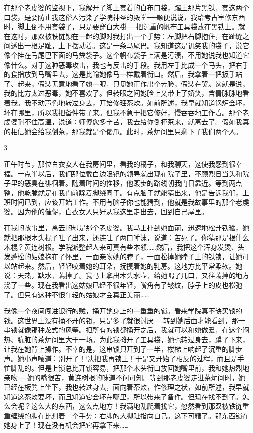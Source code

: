 在那个老虔婆的监视下，我解开了脚上套着的白布口袋，踏上那片黑铁，套这两个口袋，是要防止我这俗人污染了学院神圣的殿堂──顺便说说，我给考古室修东西时，脚上倒不用套袋子，只是要穿白大褂──把沉重的帆布工具袋放在黑铁上。就在这时，那双被铁链锁在一起的脚对我打出一个手势：左脚把右脚抱住，在趾缝之间透出一根足趾，上下摆动着。这是一条马尾巴。我知道这是讥笑我的袋子，说它像个挂在马尾巴下面的马粪袋子。这个帆布袋子上满是污渍，不用她说我也知道它像什么。对于这种恶毒攻击，我也有反击的手段。我用左手比成一个马头，把右手的食指放到马嘴里去，这是比喻她像马一样戴着衔口。然后，我拿着一把扳手站了、起来，假装无意地看了她一眼，只见她正作出个苦脸，假装在哭。这就是说，我的比方太过恶毒，她不喜欢了。但转眼之间她脸上又带上了娇笑，含情脉脉地看着我。我不动声色地转过身去，开始修理茶炊。如前所述，我早就知道锅炉会坏，坏在哪里，所以我把备件带了来。但我不急于把它修好，慢吞吞地工作着。那个老虔婆耐不住高温，说道：师傅您多辛苦，我去给你倒杯茶来，就离去了。假如我真的相信她会给我倒茶，那我就是个傻爪。此时，茶炉间里只剩下了我们两个人。 

3 

正午时节，那位白衣女人在我房间里，看我的稿子，和我聊天，这使我感到很幸福。一点半以后，我们那位戴白边眼镜的领导就出现在院子里，不顾烈日当头和院子里的恶臭在徘徊着。随着时间的推移，他踱步的路线朝我门日靠近。等到两点整，他乾脆就是在我门前跺着脚绕圈子。有点脑子就能猜出来，他是告诉我们，上班时间已到，应该开始工作。不用有脑子你也能猜到，他就是我故事里的那个老虔婆。因为他的催促，白衣女人只好从我这里走出去，回到自己屋里。 

在我的故事里，离去的却是那个老虔婆。我马上扑到她面前，迅速地松开铁箍，她就把那根木头棍子吐了出来，还连吐了两口唾沫，说道：苦死了。你猜那是根什么木棍？黄连树根。学院派整起人来可真有些本领……然后，我把这个浑身发烫、头发蓬松的姑娘抱在了怀里，一面亲吻她的脖子，一面松掉她脖子上的铁锁，让她可以站起来。然后，轻轻咬着她的耳朵，抚摸着她的乳房。这地方比平常柔软。她说：天热，缺水，蔫掉了。我马上拿出木头水壶，给她喝了几口，又往蔫掉的地方浇了一些。现在我看出这姑娘已经不很年轻，嘴角有了皱纹，脖子上的皮也松弛了。但只有这种不很年轻的姑娘才会真正美丽…… 

我像一个夜间闯进银行的贼，捅开她身上的一重重的锁。看来学院真不缺买锁的钱。这世界上没有捅不开的锁，只是多了就很讨厌──转到她后面才能看到，那一串锁就像那种龙式的风筝。把所有的锁都捅开之后，我就可以和她做爱，在这个闷热、肮脏的茶炉间里大干一场。为此我摊开了工具袋，她也转过身去，蹲了下来，让我在她背上操作。不幸的是，这串锁只开到了一半，楼梯上响起了沉重的脚步声。她小声嚷道：别开了！‘决把我再锁上！于是又开始了相反的过程，而且是手忙脚乱的。但是上锁总比开锁容易，把那个木头衔口放回她嘴里前，我和她热烈地亲吻──她的嘴很苦，黄连树根的味道不问可知。等到那老虔婆走进茶炉间时，她已经在板凳上坐下，我也转过身去，面向着茶炊，作修理之状，如前所述，我早就知道这茶炊要坏，而且知道它会坏在哪里，所以带来了备件。但现在找不到了。怎么会呢？这么大的东西，这么点地方！我满地乱爬着找它，忽然看到那双被铁链重重缠绕的脚在比划着一个手势：右脚的大脚趾指向自己。这下可糟了。那东西锁在她身上了！现在没有机会把它再拿下来…… 

